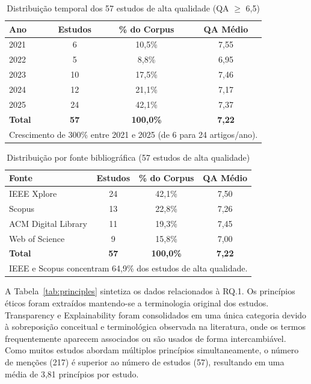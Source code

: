 \begin{table}[htbp]
\centering
\caption{Distribuição temporal dos 57 estudos de alta qualidade (QA $\geq$ 6,5)}
\label{tab:selected}
\footnotesize
\begin{tabular}{lccc}
\hline
\textbf{Ano} & \textbf{Estudos} & \textbf{\% do Corpus} & \textbf{QA Médio} \\
\hline
2021 & 6  & 10,5\%  & 7,55 \\
2022 & 5  & 8,8\%   & 6,95 \\
2023 & 10 & 17,5\%  & 7,46 \\
2024 & 12 & 21,1\%  & 7,17 \\
2025 & 24 & 42,1\%  & 7,37 \\
\hline
\textbf{Total} & \textbf{57} & \textbf{100,0\%} & \textbf{7,22} \\
\hline
\multicolumn{4}{l}{\footnotesize Crescimento de 300\% entre 2021 e 2025 (de 6 para 24 artigos/ano).} \\
\end{tabular}
\end{table}

\begin{table}[htbp]
\centering
\caption{Distribuição por fonte bibliográfica (57 estudos de alta qualidade)}
\label{tab:source_distribution}
\footnotesize
\begin{tabular}{lccc}
\hline
\textbf{Fonte} & \textbf{Estudos} & \textbf{\% do Corpus} & \textbf{QA Médio} \\
\hline
IEEE Xplore           & 24 & 42,1\% & 7,50 \\
Scopus                & 13 & 22,8\% & 7,26 \\
ACM Digital Library   & 11 & 19,3\% & 7,45 \\
Web of Science        & 9  & 15,8\% & 7,00 \\
\hline
\textbf{Total} & \textbf{57} & \textbf{100,0\%} & \textbf{7,22} \\
\hline
\multicolumn{4}{l}{\footnotesize IEEE e Scopus concentram 64,9\% dos estudos de alta qualidade.} \\ 
\end{tabular} 
\end{table}

A Tabela~\ref{tab:principles} sintetiza os dados relacionados à RQ.1. Os princípios éticos foram extraídos mantendo-se a terminologia original dos estudos. Transparency e Explainability foram consolidados em uma única categoria devido à sobreposição conceitual e terminológica observada na literatura, onde os termos frequentemente aparecem associados ou são usados de forma intercambiável. Como muitos estudos abordam múltiplos princípios simultaneamente, o número de menções (217) é superior ao número de estudos (57), resultando em uma média de 3,81 princípios por estudo.

